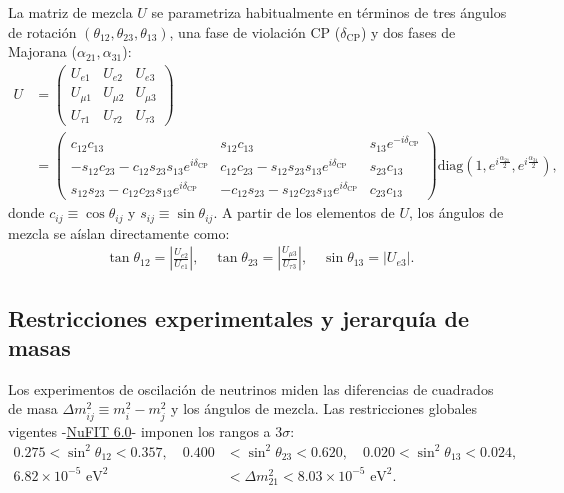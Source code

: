 \documentclass[12pt]{article}
\begin{document}
\begin{cajaflex}
La matriz de mezcla $U$ se parametriza habitualmente en términos de tres ángulos de rotación 
$(\theta_{12}, \theta_{23}, \theta_{13})$, 
una fase de violación CP ($\delta_{\text{CP}}$) y dos fases de Majorana ($\alpha_{21}, \alpha_{31}$):
%
\begin{align*}
   U &= \begin{pmatrix} U_{e1} & U_{e2} & U_{e3} \\ U_{\mu 1} & U_{\mu 2} & U_{\mu 3} \\ U_{\tau 1} & U_{\tau 2} & U_{\tau 3} \end{pmatrix}\\ 
   & = \begin{pmatrix} 
      c_{12} c_{13} & s_{12} c_{13} & s_{13} e^{-i\delta_{\text{CP}}} \\
      -s_{12} c_{23} - c_{12} s_{23} s_{13} e^{i\delta_{\text{CP}}} & c_{12} c_{23} - s_{12} s_{23} s_{13} e^{i\delta_{\text{CP}}} & s_{23} c_{13} \\
      s_{12} s_{23} - c_{12} c_{23} s_{13} e^{i\delta_{\text{CP}}} & -c_{12} s_{23} - s_{12} c_{23} s_{13} e^{i\delta_{\text{CP}}} & c_{23} c_{13}
   \end{pmatrix} \text{diag}\left(1, e^{i\frac{\alpha_{21}}{2}}, e^{i\frac{\alpha_{31}}{2}}\right),
\end{align*}
%
donde $c_{ij} \equiv \cos\theta_{ij}$ y $s_{ij} \equiv \sin\theta_{ij}$. A partir de los elementos de $U$, los ángulos de mezcla se aíslan directamente como:
%
\begin{align*}
   \tan\theta_{12} = \left| \frac{U_{e2}}{U_{e1}} \right|, \quad \tan\theta_{23} = \left| \frac{U_{\mu 3}}{U_{\tau 3}} \right|, \quad \sin\theta_{13} = |U_{e3}|.
\end{align*}



\subsection*{Restricciones experimentales y jerarquía de masas}

Los experimentos de oscilación de neutrinos miden las diferencias de 
cuadrados de masa $\Delta m_{ij}^2 \equiv m_i^2 - m_j^2$ y los ángulos de mezcla. 
Las restricciones globales vigentes -\href{https://www.nu-fit.org/}{NuFIT 6.0}-
imponen los rangos a $3\sigma$:
%
\begin{align*}
   0.275 < \sin^2\theta_{12} < 0.357, \quad 0.400 &< \sin^2\theta_{23} < 0.620, \quad 0.020 < \sin^2\theta_{13} < 0.024, \\[2mm]
   6.82 \times 10^{-5}\text{ eV}^2 &< \Delta m_{21}^2 < 8.03 \times 10^{-5}\text{ eV}^2.
\end{align*}


\end{cajaflex}
\end{document}
